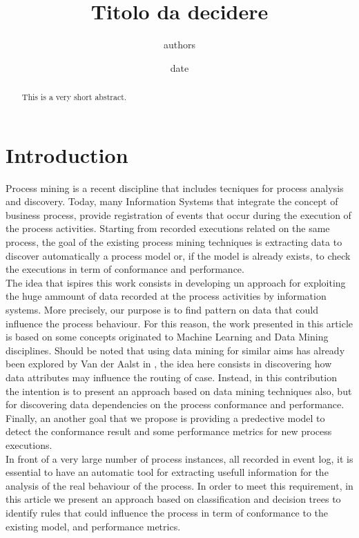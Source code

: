 \documentclass[11pt]{article}
\title{Titolo da decidere}
\author{authors}
\date{date}
\begin{document}
\maketitle
\begin{abstract}
This is a very short abstract.
\end{abstract}

\section{Introduction}

Process mining is a recent discipline that includes tecniques for process analysis and discovery. Today, many Information Systems that integrate the concept of business process, provide registration of events that occur during the execution of the process activities. Starting from recorded executions related on the same process, the goal of the existing process mining techniques is extracting data to discover automatically a process model or, if the model is already exists, to check the executions in term of conformance and performance.\\
\newline
The idea that ispires this work consists in developing un approach for exploiting the huge ammount of data recorded at the process activities by information systems. More precisely, our purpose is to find pattern on data that could influence the process behaviour. For this reason, the work presented in this article is based on some concepts originated to Machine Learning and Data Mining disciplines. Should be noted that using data mining for similar aims has already been explored by Van der Aalst in \cite{}, the idea here consists in discovering how data attributes may influence the routing of case. Instead, in this contribution the intention is to present an approach based on data mining techniques also, but for discovering data dependencies on the process conformance and performance. Finally, an another goal that we propose is providing a predective model to detect the conformance result and some performance metrics for new process executions.  \\

In front of a very large number of process instances, all recorded in event log, it is essential to have an automatic tool for extracting usefull information for the analysis of the real behaviour of the process. In order to meet this requirement, in this article we present an approach based on classification and decision trees to identify rules that could influence the process in term of conformance to the existing model, and performance metrics.\\
\end{document}
